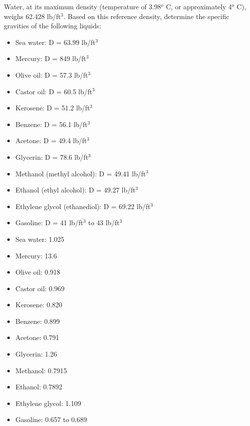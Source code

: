 

Water, at its maximum density (temperature of 3.98$^{o}$ C, or approximately 4$^{o}$ C), weighs 62.428 lb/ft$^{3}$.  Based on this reference density, determine the specific gravities of the following liquids:

\begin{itemize}
\item{} Sea water: D = 63.99 lb/ft$^{3}$
\item{} Mercury: D = 849 lb/ft$^{3}$
\item{} Olive oil: D = 57.3 lb/ft$^{3}$
\item{} Castor oil: D = 60.5 lb/ft$^{3}$
\item{} Kerosene: D = 51.2 lb/ft$^{3}$
\item{} Benzene: D = 56.1 lb/ft$^{3}$
\item{} Acetone: D = 49.4 lb/ft$^{3}$
\item{} Glycerin: D = 78.6 lb/ft$^{3}$
\item{} Methanol (methyl alcohol): D = 49.41 lb/ft$^{3}$
\item{} Ethanol (ethyl alcohol): D = 49.27 lb/ft$^{3}$
\item{} Ethylene glycol (ethanediol): D = 69.22 lb/ft$^{3}$
\item{} Gasoline: D = 41 lb/ft$^{3}$ to 43 lb/ft$^{3}$
\end{itemize}







\begin{itemize}
\item{} Sea water: 1.025
\item{} Mercury: 13.6
\item{} Olive oil: 0.918
\item{} Castor oil: 0.969
\item{} Kerosene: 0.820
\item{} Benzene: 0.899
\item{} Acetone: 0.791
\item{} Glycerin: 1.26
\item{} Methanol: 0.7915
\item{} Ethanol: 0.7892
\item{} Ethylene glycol: 1.109
\item{} Gasoline: 0.657 to 0.689
\end{itemize}











